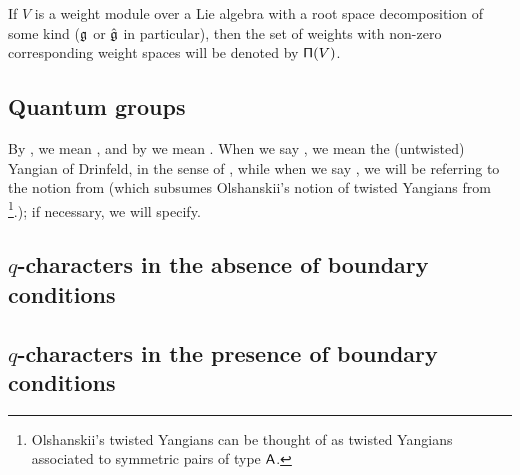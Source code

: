         If $V$ is a weight module over a Lie algebra with a root space decomposition of some kind ($\mathfrak{g}$ or $\hat{\mathfrak{g}}$ in particular), then the set of weights with non-zero corresponding weight spaces will be denoted by $\mathsf{\Pi}(V)$. 

    \subsection{Quantum groups}
        By , we mean , and by  we mean . When we say , we mean the (untwisted) Yangian of Drinfeld, in the sense of \cite{drinfeld_original_yangian_paper}, while when we say , we will be referring to the notion from \cite{guay_regelskis_twisted_yangians_for_symmetric_pairs_of_types_BCD} (which subsumes Olshanskii's notion of twisted Yangians from \cite{olshanski_twisted_yangians_and_infinite_dimensional_classical_lie_algebras}\footnote{Olshanskii's twisted Yangians can be thought of as twisted Yangians associated to symmetric pairs of type $\mathsf{A}$.}.); if necessary, we will specify.

    \subsection{\texorpdfstring{$q$-characters in the absence of boundary conditions}{}}

    \subsection{\texorpdfstring{$q$-characters in the presence of boundary conditions}{}}
